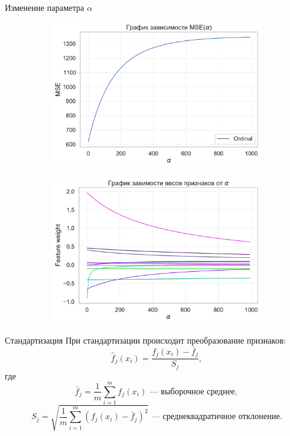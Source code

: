 \documentclass{beamer} %
\begin{document}
\begin{frame}{Изменение параметра $\alpha$}
\begin{figure}
\begin{subfigure}[b]{0.475\textwidth}
                \includegraphics[width=\textwidth]{MSE_plot.pdf}
            \end{subfigure}
            \hfill
            \begin{subfigure}[b]{0.475\textwidth}   
                \centering 
                \includegraphics[width=\textwidth]{feature_plot.pdf}
            \end{subfigure} 
        \end{figure}
    \end{frame}

    \begin{frame}{Стандартизация}
        При стандартизации происходит преобразование признаков:
        \[ \hat{f}_j({x}_i) = \dfrac{f_j({x}_i) - \bar{f}_j}{S_j}, \]
        где 
        \[ \bar{f}_j = \dfrac{1}{m} \sum\limits_{i = 1}^m f_j({x}_i) \text{~--- выборочное среднее}, \]
        \[ S_j = \sqrt{\dfrac{1}{m} \sum\limits_{i=1}^m (f_j({x}_i) - \bar{f}_j)^2} \text{~--- среднеквадратичное отклонение}. \]
    \end{frame}
\end{document}
